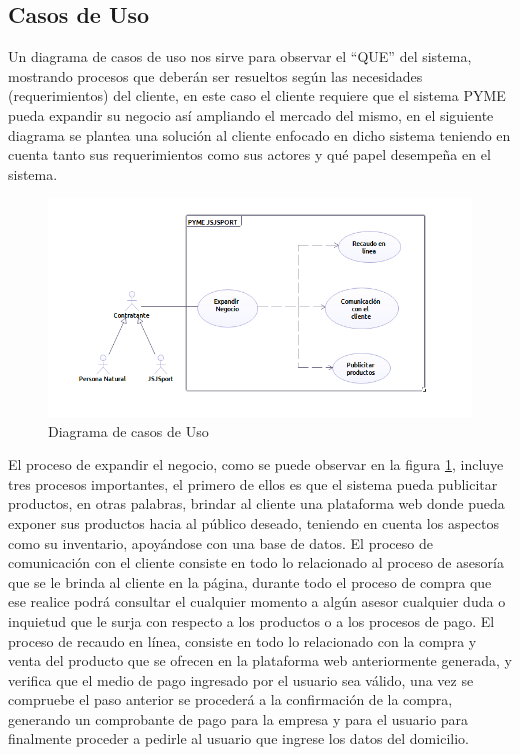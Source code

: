 \subsection{Casos de Uso}

Un diagrama de casos de uso nos sirve para observar el “QUE” del sistema, mostrando procesos que deberán ser resueltos según las necesidades (requerimientos) del cliente, en este caso el cliente requiere que el sistema PYME pueda expandir su negocio así ampliando el mercado del mismo, en el siguiente diagrama se plantea una solución al cliente enfocado en dicho sistema teniendo en cuenta tanto sus requerimientos como sus actores y qué papel desempeña en el sistema.


\begin{figure}[th!]
	\centering
	\includegraphics[width=0.7\linewidth]{arquitectura/imagenes/casosDeUso}
	\caption{Diagrama de  casos de Uso}
	\label{fig:casosUso}
\end{figure}

El proceso de expandir el negocio, como  se puede observar en la figura \ref{fig:casosUso}, incluye tres procesos importantes, el primero de ellos es que el sistema pueda publicitar productos, en otras palabras,  brindar al cliente una plataforma web donde pueda exponer sus productos hacia al público deseado, teniendo en cuenta los aspectos como su inventario, apoyándose con una base de datos.\newline
El proceso de comunicación con el cliente consiste en todo lo  relacionado al proceso de asesoría que se le brinda al cliente en la página, durante todo el proceso de compra que ese realice podrá consultar el cualquier momento a algún asesor cualquier duda o inquietud que le surja con respecto a los productos o a los procesos de pago. \newline
El proceso de recaudo en línea, consiste en todo lo relacionado con la compra y venta del producto que se ofrecen en la plataforma web anteriormente generada, y verifica que el medio de pago ingresado por el usuario sea válido, una vez se compruebe el paso anterior se procederá a la confirmación de la compra, generando un comprobante de pago para la empresa y para el usuario para finalmente  proceder a pedirle al usuario que ingrese los datos del domicilio.



